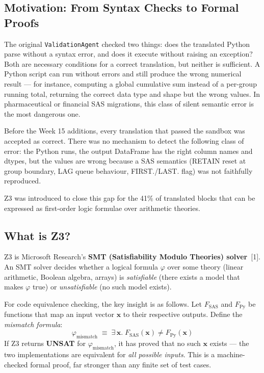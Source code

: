 \subsection{Motivation: From Syntax Checks to Formal Proofs}
\label{subsec:z3-motivation}

The original \texttt{ValidationAgent} checked two things: does the translated
Python parse without a syntax error, and does it execute without raising an
exception? Both are necessary conditions for a correct translation, but
neither is sufficient. A Python script can run without errors and still produce
the wrong numerical result --- for instance, computing a global cumulative sum
instead of a per-group running total, returning the correct data type and
shape but the wrong values. In pharmaceutical or financial SAS migrations,
this class of silent semantic error is the most dangerous one.

Before the Week 15 additions, every translation that passed the sandbox was
accepted as correct. There was no mechanism to detect the following class of
error: the Python runs, the output DataFrame has the right column names and
dtypes, but the values are wrong because a SAS semantics (RETAIN reset at
group boundary, LAG queue behaviour, FIRST./LAST. flag) was not faithfully
reproduced.

Z3 was introduced to close this gap for the 41\% of translated blocks that
can be expressed as first-order logic formulae over arithmetic theories.

\subsection{What is Z3?}
\label{subsec:z3-theory}

Z3 is Microsoft Research's \textbf{SMT (Satisfiability Modulo Theories) solver}~[1].
An SMT solver decides whether a logical formula $\varphi$ over some theory
(linear arithmetic, Boolean algebra, arrays) is \emph{satisfiable} (there
exists a model that makes $\varphi$ true) or \emph{unsatisfiable} (no such
model exists).

For code equivalence checking, the key insight is as follows. Let $F_{\text{SAS}}$
and $F_{\text{Py}}$ be functions that map an input vector $\mathbf{x}$ to their
respective outputs. Define the \emph{mismatch formula}:
\begin{equation}
  \varphi_{\text{mismatch}} \;\equiv\; \exists\, \mathbf{x}.\;
  F_{\text{SAS}}(\mathbf{x}) \neq F_{\text{Py}}(\mathbf{x})
  \label{eq:mismatch}
\end{equation}
If Z3 returns \textbf{UNSAT} for $\varphi_{\text{mismatch}}$, it has proved
that no such $\mathbf{x}$ exists --- the two implementations are equivalent
for \emph{all possible inputs}. This is a machine-checked formal proof, far
stronger than any finite set of test cases.

